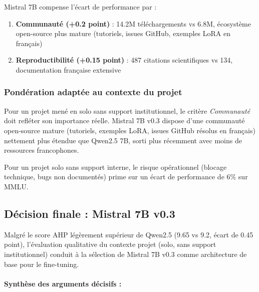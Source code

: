 \vspace{0.3cm}

Mistral 7B compense l'écart de performance par :

\begin{enumerate}
    \item \textbf{Communauté (+0.2 point)} : 14.2M téléchargements vs 6.8M, écosystème open-source plus mature (tutoriels, issues GitHub, exemples LoRA en français)
    
    \item \textbf{Reproductibilité (+0.15 point)} : 487 citations scientifiques vs 134, documentation française extensive
\end{enumerate}

\subsubsection{Pondération adaptée au contexte du projet}

Pour un projet mené en solo sans support institutionnel, le critère \textit{Communauté} doit refléter son importance réelle. Mistral 7B v0.3 dispose d'une communauté open-source mature (tutoriels, exemples LoRA, issues GitHub résolus en français) nettement plus étendue que Qwen2.5 7B, sorti plus récemment avec moins de ressources francophones.

Pour un projet solo sans support interne, le risque opérationnel (blocage technique, bugs non documentés) prime sur un écart de performance de 6\% sur MMLU.

\subsection{Décision finale : Mistral 7B v0.3}

Malgré le score AHP légèrement supérieur de Qwen2.5 (9.65 vs 9.2, écart de 0.45 point), l'évaluation qualitative du contexte projet (solo, sans support institutionnel) conduit à la sélection de Mistral 7B v0.3 comme architecture de base pour le fine-tuning.

\paragraph{Synthèse des arguments décisifs :}


